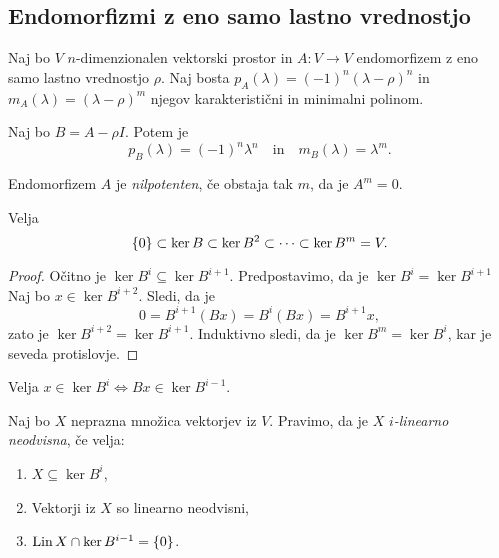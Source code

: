 \documentclass[12pt, a4paper]{article}
\begin{document}
\newpage

\subsection{Endomorfizmi z eno samo lastno vrednostjo}

Naj bo $V$ $n$-dimenzionalen vektorski prostor in $A\colon V\to V$ endomorfizem z eno samo lastno vrednostjo $\rho$. Naj bosta $p_A(\lambda)=(-1)^n(\lambda-\rho)^n$ in $m_A(\lambda)=(\lambda-\rho)^m$ njegov karakteristični in minimalni polinom.

\begin{trditev}
Naj bo $B=A-\rho I$. Potem je
\[
p_B(\lambda)=(-1)^n\lambda^n\quad\text{in}\quad m_B(\lambda)=\lambda^m.
\]
\end{trditev}

\obvs

\begin{definicija}
Endomorfizem $A$ je \emph{nilpotenten}, če obstaja tak $m$, da je $A^m=0$.
\end{definicija}

\begin{trditev}
Velja
\[
\left\{0\right\}\subset\ker B\subset\ker B^2\subset\dots\subset\ker B^m=V.
\]
\end{trditev}

\begin{proof}
Očitno je $\ker B^i\subseteq \ker B^{i+1}$. Predpostavimo, da je $\ker B^i=\ker B^{i+1}$ Naj bo $x\in\ker B^{i+2}$. Sledi, da je
\[
0=B^{i+1}(Bx)=B^i(Bx)=B^{i+1}x,
\]
zato je $\ker B^{i+2}=\ker B^{i+1}$. Induktivno sledi, da je $\ker B^m=\ker B^i$, kar je seveda protislovje.
\end{proof}

\begin{trditev}
Velja $x\in\ker B^i\iff Bx\in\ker B^{i-1}$.
\end{trditev}

\obvs

\begin{definicija}
Naj bo $X$ neprazna množica vektorjev iz $V$. Pravimo, da je $X$ \emph{$i$-linearno neodvisna}, če velja:

\begin{enumerate}[label=\roman*)]
\item $X\subseteq \ker B^i$,
\item Vektorji iz $X$ so linearno neodvisni,
\item $\operatorname{Lin} X\cap\ker B^{i-1}=\left\{0\right\}$.
\end{enumerate}
\end{definicija}
\end{document}
